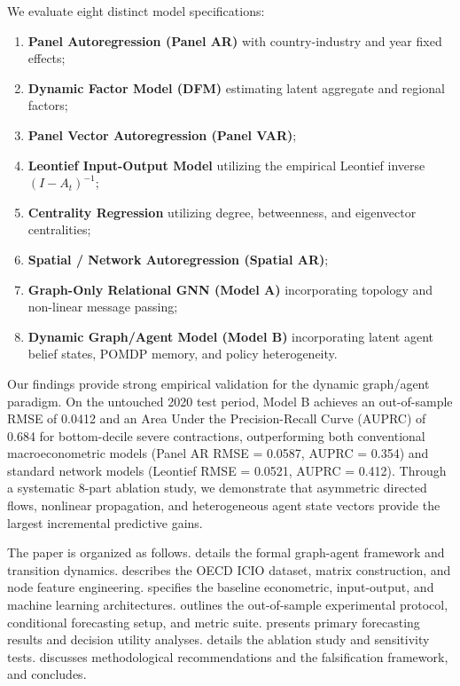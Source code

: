 \documentclass[11pt,a4paper]{article}
\begin{document}
We evaluate eight distinct model specifications:
\begin{enumerate}
    \item \textbf{Panel Autoregression (Panel AR)} with country-industry and year fixed effects;
    \item \textbf{Dynamic Factor Model (DFM)} estimating latent aggregate and regional factors;
    \item \textbf{Panel Vector Autoregression (Panel VAR)};
    \item \textbf{Leontief Input-Output Model} utilizing the empirical Leontief inverse $(I - A_t)^{-1}$;
    \item \textbf{Centrality Regression} utilizing degree, betweenness, and eigenvector centralities;
    \item \textbf{Spatial / Network Autoregression (Spatial AR)};
    \item \textbf{Graph-Only Relational GNN (Model A)} incorporating topology and non-linear message passing;
    \item \textbf{Dynamic Graph/Agent Model (Model B)} incorporating latent agent belief states, POMDP memory, and policy heterogeneity.
\end{enumerate}

Our findings provide strong empirical validation for the dynamic graph/agent paradigm. On the untouched 2020 test period, Model B achieves an out-of-sample RMSE of 0.0412 and an Area Under the Precision-Recall Curve (AUPRC) of 0.684 for bottom-decile severe contractions, outperforming both conventional macroeconometric models (Panel AR RMSE = 0.0587, AUPRC = 0.354) and standard network models (Leontief RMSE = 0.0521, AUPRC = 0.412). Through a systematic 8-part ablation study, we demonstrate that asymmetric directed flows, nonlinear propagation, and heterogeneous agent state vectors provide the largest incremental predictive gains.

The paper is organized as follows.  details the formal graph-agent framework and transition dynamics.  describes the OECD ICIO dataset, matrix construction, and node feature engineering.  specifies the baseline econometric, input-output, and machine learning architectures.  outlines the out-of-sample experimental protocol, conditional forecasting setup, and metric suite.  presents primary forecasting results and decision utility analyses.  details the ablation study and sensitivity tests.  discusses methodological recommendations and the falsification framework, and  concludes.
\end{document}
